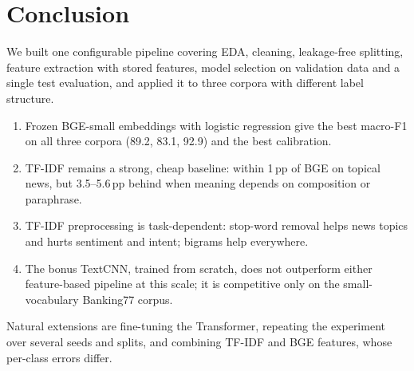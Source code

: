 \section{Conclusion}
\label{sec:conclusion}

We built one configurable pipeline covering EDA, cleaning, leakage-free splitting, feature extraction with stored features, model selection on validation data and a single test evaluation, and applied it to three corpora with different label structure.

\begin{enumerate}
  \item Frozen BGE-small embeddings with logistic regression give the best macro-F1 on all three corpora (89.2, 83.1, 92.9) and the best calibration.
  \item TF-IDF remains a strong, cheap baseline: within 1\,pp of BGE on topical news, but 3.5--5.6\,pp behind when meaning depends on composition or paraphrase.
  \item TF-IDF preprocessing is task-dependent: stop-word removal helps news topics and hurts sentiment and intent; bigrams help everywhere.
  \item The bonus TextCNN, trained from scratch, does not outperform either feature-based pipeline at this scale; it is competitive only on the small-vocabulary Banking77 corpus.
\end{enumerate}

Natural extensions are fine-tuning the Transformer, repeating the experiment over several seeds and splits, and combining TF-IDF and BGE features, whose per-class errors differ.
